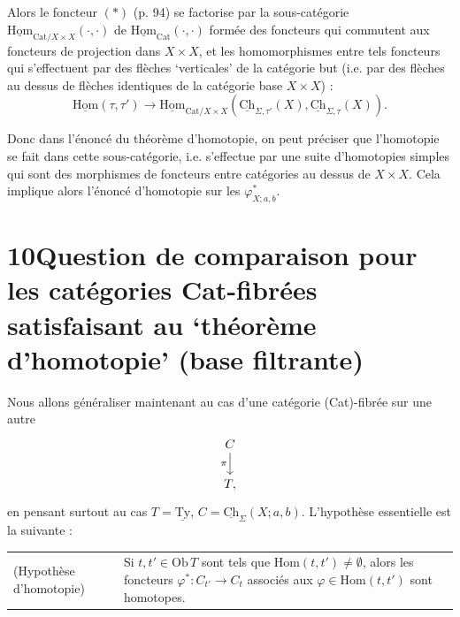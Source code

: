 \documentclass[11pt]{article}
\newcommand{\printedpage}[1]{\marginpar{\footnotesize p.~#1}}
\newcommand{\msp}[1]{\marginpar{\footnotesize [#1]}}
\newcommand{\uTy}{\underline{\mathrm{Ty}}}
\newcommand{\Hom}{\mathrm{Hom}}
\newcommand{\uHom}{\underline{\mathrm{Hom}}}
\newcommand{\uCh}{\underline{\mathrm{Ch}}}
\newcommand{\Ob}{\mathrm{Ob}\,}
\begin{document}
Alors le foncteur $(*)$ (p. 94) se factorise par la sous-catégorie $\uHom_{\mathrm{Cat}/X\times X}(\cdot,\cdot)$ de $\uHom_{\mathrm{Cat}}(\cdot,\cdot)$ formée des foncteurs qui commutent aux foncteurs de projection dans $X\times X$, et les homomorphismes entre tels foncteurs qui s'effectuent par des flèches `verticales' de la catégorie but (i.e. par des flèches au dessus de flèches identiques de la catégorie base $X\times X$) :
\[
\uHom(\tau,\tau')\longrightarrow\uHom_{\mathrm{Cat}/X\times X}(\uCh_{\Sigma,\tau'}(X),\uCh_{\Sigma,\tau}(X)).
\]

Donc dans l'énoncé du théorème d'homotopie, on peut préciser que l'homotopie se fait dans cette sous-catégorie, i.e. s'effectue par une suite d'homotopies simples qui sont des morphismes de foncteurs entre catégories au dessus de $X\times X$. Cela implique alors l'énoncé d'homotopie sur les $\varphi^*_{X;a,b}$.

\leavevmode\printedpage{64}
\msp{page 99}

\section*{10\quad Question de comparaison pour les catégories \textmd{Cat}-fibrées satisfaisant au ‘théorème d'homotopie' (base filtrante)}

Nous allons généraliser maintenant au cas d'une catégorie (Cat)-fibrée sur une autre
\[
\begin{tikzcd}
C \arrow[d, "\pi"'] \\
T,
\end{tikzcd}
\]
en pensant surtout au cas $T = \uTy$, $C = \uCh_{\Sigma}(X;a,b)$. L'hypothèse essentielle est la suivante :

\noindent\begin{tabular}{@{}p{}p{}@{}}
(Hypothèse d'homotopie) & Si $t,t' \in \Ob T$ sont tels que $\Hom(t,t') \neq \emptyset$, alors les foncteurs $\varphi^{*} : C_{t'} \longrightarrow C_{t}$ associés aux $\varphi \in \Hom(t,t')$ sont homotopes.
\end{tabular}
\end{document}
